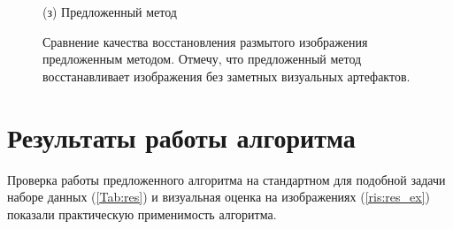 \begin{figure}[H]
\begin{minipage}[t]{0.22\linewidth}
(з) Предложенный метод\\
\end{minipage}

\caption{Сравнение качества восстановления размытого изображения предложенным методом. Отмечу, что предложенный метод восстанавливает изображения без заметных визуальных артефактов.}
\label{ris:restore_example_big}
\end{figure}

\newpage
\section{Результаты работы алгоритма}

Проверка работы предложенного алгоритма на стандартном для подобной задачи наборе данных (\ref{Tab:res}) и визуальная оценка на изображениях (\ref{ris:res_ex}) показали практическую применимость алгоритма.

